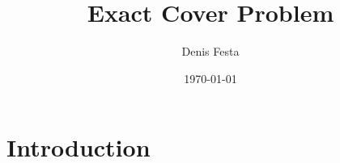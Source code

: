 \documentclass{beamer}
\title{Exact Cover Problem}
\author{Denis Festa}
\date{\today}
\begin{document}
\frame{\titlepage}


\section*{Introduction}

\begin{frame}

\end{frame}
\end{document}
